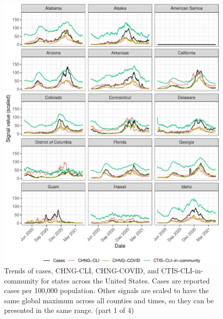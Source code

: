 \documentclass[9pt,twoside,lineno]{pnas-new}
\begin{document}
\clearpage

\begin{figure}

{\centering \includegraphics[width=\textwidth]{fig/state-trend-grids-1-1} 

}

\caption{Trends of cases, CHNG-CLI, CHNG-COVID, and CTIS-CLI-in-community for states across the United States. Cases are reported cases per 100,000 population. Other signals are scaled to have the same global maximum across all counties and times, so they can be presented in the same range. (part 1 of 4)}\label{fig:state-trend-grids-1}
\end{figure}

\clearpage
\end{document}
